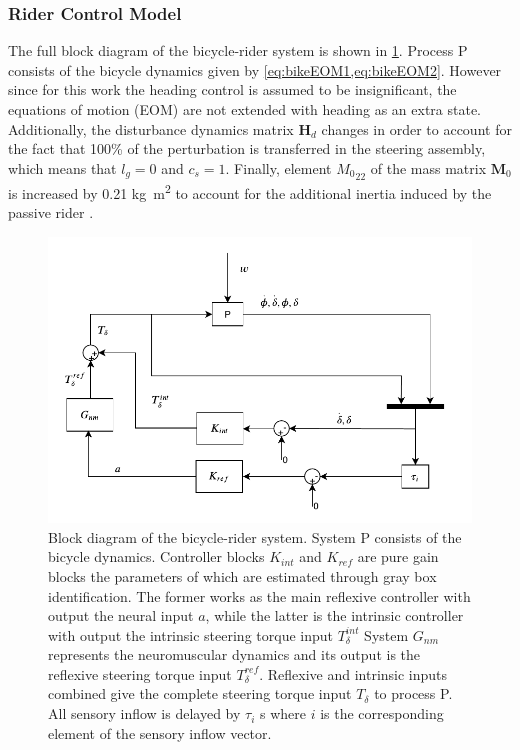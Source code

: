 \subsubsection{Rider Control Model}
The full block diagram of the bicycle-rider system is shown in \cref{fig:intrinsic_block}. Process P consists of the bicycle dynamics given by \cref{eq:bikeEOM1,eq:bikeEOM2}. However since for this work the heading control is assumed to be insignificant, the equations of motion (EOM) are not extended with heading as an extra state. Additionally, the disturbance dynamics matrix \ensuremath{\boldsymbol{H}_d} changes in order to account for the fact that 100\% of the perturbation is transferred in the steering assembly, which means that \ensuremath{l_g=0} and \ensuremath{c_s=1}. Finally, element \ensuremath{{{M}_0}_{22}} of the mass matrix \ensuremath{\boldsymbol{M}_0} is increased by 0.21 \si{\kilogram.m^2} to account for the additional inertia induced by the passive rider \cite{schwab2012lateral}. 
\begin{figure}[h!]
    \centering

    \includegraphics[width=\linewidth]{images/steer_irf/steering_block.pdf}
    \caption{Block diagram of the bicycle-rider system. System P consists of the bicycle dynamics. Controller blocks \ensuremath{K_{int}} and \ensuremath{K_{ref}} are pure gain blocks the parameters of which are estimated through gray box identification. The former works as the main reflexive controller with output the neural input \ensuremath{a}, while the latter is the intrinsic controller with output the intrinsic steering torque input \ensuremath{T^{int}_{\delta}} System \ensuremath{G_{nm}} represents the neuromuscular dynamics and its output is the reflexive steering torque input \ensuremath{T^{ref}_{\delta}}. Reflexive and intrinsic inputs combined give the complete steering torque input \ensuremath{T_\delta} to process P. All sensory inflow is delayed by \ensuremath{\tau_i} \si{\second} where \ensuremath{i} is the corresponding element of the sensory inflow vector.  }
    \label{fig:intrinsic_block}
\end{figure}
